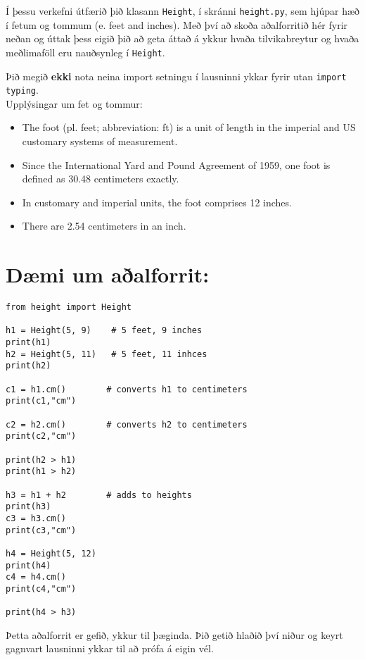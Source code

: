 
Í þessu verkefni útfærið þið klasann \texttt{Height}, í skránni \texttt{height.py}, sem hjúpar hæð í fetum og tommum (e. feet and inches). 
Með því að skoða aðalforritið hér fyrir neðan og úttak þess eigið þið að geta áttað á ykkur hvaða tilvikabreytur og hvaða meðlimaföll eru nauðsynleg í \texttt{Height}. 

Þið megið \textbf{ekki} nota neina import setningu í lausninni ykkar fyrir utan \texttt{import typing}. \\

\noindent
Upplýsingar um fet og tommur:
\begin{itemize}
\item The foot (pl. feet; abbreviation: ft) is a unit of length in the imperial and US customary systems of measurement.
\item Since the International Yard and Pound Agreement of 1959, one foot is defined as 30.48 centimeters exactly.
\item In customary and imperial units, the foot comprises 12 inches. 
\item There are 2.54 centimeters in an inch.
\end{itemize}


\section*{Dæmi um aðalforrit:}

\begin{verbatim}
from height import Height

h1 = Height(5, 9)    # 5 feet, 9 inches
print(h1)
h2 = Height(5, 11)   # 5 feet, 11 inhces
print(h2)

c1 = h1.cm()        # converts h1 to centimeters
print(c1,"cm")

c2 = h2.cm()        # converts h2 to centimeters
print(c2,"cm")

print(h2 > h1)      
print(h1 > h2)

h3 = h1 + h2        # adds to heights
print(h3)
c3 = h3.cm()
print(c3,"cm")

h4 = Height(5, 12)
print(h4)
c4 = h4.cm()
print(c4,"cm")

print(h4 > h3)
\end{verbatim}

Þetta aðalforrit er gefið, ykkur til þæginda.
Þið getið hlaðið því niður og keyrt gagnvart lausninni ykkar til að prófa á eigin vél.


\pagebreak
